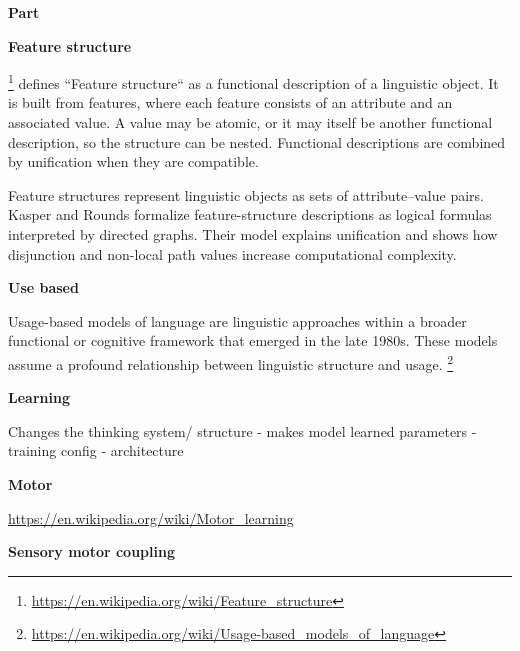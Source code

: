 \documentclass{book}
\providecommand{\ProjectDeepHeading}[2]{%
    \par\medskip\noindent\textbf{#2}\par\smallskip
}
\providecommand{\seeherefooter}[1]{\footnote{\url{#1}}}
\begin{document}
\ProjectDeepHeading{6}{Part}

\ProjectDeepHeading{7}{Feature structure}


\seeherefooter{https://en.wikipedia.org/wiki/Feature_structure}
    \cite{kay-1984-functional-unification-grammar} defines ``Feature structure`` as a functional description of a linguistic object. It is built from features, where each feature consists of an attribute and an associated value. A value may be atomic, or it may itself be another functional description, so the structure can be nested. Functional descriptions are combined by unification when they are compatible.
    
    Feature structures \cite{kasper-1986-a-logical-semantics-for-feature-structures} represent linguistic objects as sets of attribute--value pairs. Kasper and Rounds formalize feature-structure descriptions as logical formulas interpreted by directed graphs.
    Their model explains unification and shows how disjunction and non-local path values increase computational complexity.

\ProjectDeepHeading{5}{Use based}


Usage-based models of language are linguistic approaches within a broader functional or cognitive framework that emerged in the late 1980s. These models assume a profound relationship between linguistic structure and usage. \seeherefooter{https://en.wikipedia.org/wiki/Usage-based_models_of_language}

\ProjectDeepHeading{3}{Learning}


Changes the thinking system/ structure
    - makes model learned parameters
    - training config
    - architecture

\ProjectDeepHeading{4}{Motor}


\url{https://en.wikipedia.org/wiki/Motor_learning}

\ProjectDeepHeading{4}{Sensory motor coupling}
\end{document}
